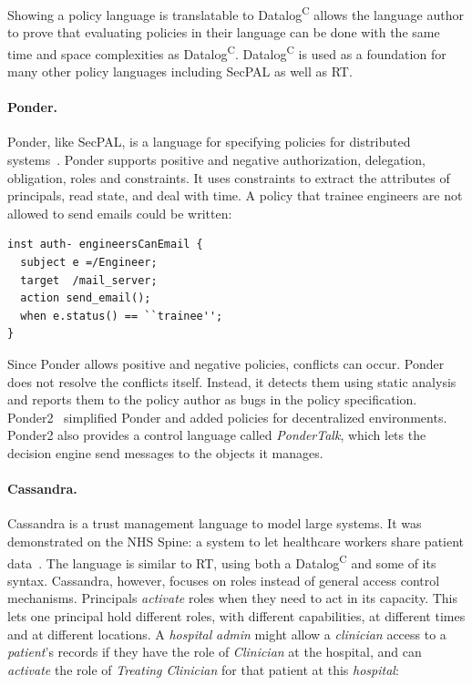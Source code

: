 \documentclass[thesis.tex]{subfiles}
\begin{document}
Showing a policy language is translatable to Datalog\textsuperscript{C} allows
the language author to prove that evaluating policies in their language can be
done with the same time and space complexities as Datalog\textsuperscript{C}.
Datalog\textsuperscript{C} is used as a foundation for many other policy
languages including SecPAL as well as RT.

\paragraph*{Ponder.}
Ponder, like SecPAL, is a language for specifying policies for distributed
systems~\cite{damianou_ponder_2001}. Ponder supports positive and negative
authorization, delegation, obligation, roles and constraints. It uses
constraints to extract the attributes of principals, read state, and deal with
time. A policy that trainee engineers are not allowed to send emails could be
written:

\begin{lstlisting}
inst auth- engineersCanEmail {
  subject e =/Engineer;
  target  /mail_server;
  action send_email();
  when e.status() == ``trainee'';
}
\end{lstlisting}

Since Ponder allows positive and negative policies, conflicts can occur. Ponder
does not resolve the conflicts itself. Instead, it detects them using static
analysis and reports them to the policy author as bugs in the policy
specification. Ponder2~\cite{twidle_ponder2:_2009} simplified Ponder and added
policies for decentralized environments. Ponder2 also provides a control
language called \emph{PonderTalk}, which lets the decision engine send messages
to the objects it manages.

\paragraph*{Cassandra.}
Cassandra is a trust management language to model large systems.
It was demonstrated on the NHS Spine: a system to let healthcare
workers share patient
data~\cite{becker_cassandra:_2004,becker_cassandra:_2004-1}.  The
language is similar to RT, using both a Datalog\textsuperscript{C} and some
of its syntax. Cassandra, however, focuses on roles instead of general access
control mechanisms.  Principals \emph{activate} roles when they need to act in its
capacity.  This lets one principal hold different roles, with
different capabilities, at different times and at different
locations.  A \emph{hospital} \emph{admin} might allow a
\emph{clinician} access to a \emph{patient}'s records if they
have the role of \emph{Clinician} at the hospital, and can
\emph{activate} the role of \emph{Treating Clinician} for that patient
at this \emph{hospital}:
\end{document}
